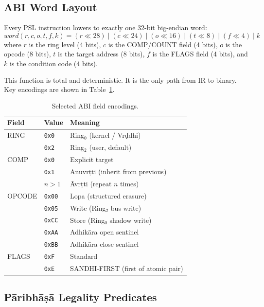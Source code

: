 \documentclass[11pt,a4paper]{article}
\begin{document}
\subsection{ABI Word Layout}

Every PSL instruction lowers to exactly one 32-bit big-endian word:
\begin{equation}
\label{eq:word}
  \mathit{word}(r,c,o,t,f,k) =
    (r \ll 28) \;|\; (c \ll 24) \;|\; (o \ll 16) \;|\; (t \ll 8)
    \;|\; (f \ll 4) \;|\; k
\end{equation}
where $r$ is the ring level (4 bits), $c$ is the COMP/COUNT field (4 bits),
$o$ is the opcode (8 bits), $t$ is the target address (8 bits), $f$ is the
FLAGS field (4 bits), and $k$ is the condition code (4 bits).

This function is total and deterministic. It is the only path from IR to
binary. Key encodings are shown in Table~\ref{tab:fields}.

\begin{table}[t]
\caption{Selected ABI field encodings.}
\label{tab:fields}
\begin{tabular}{lll}
\toprule
\textbf{Field} & \textbf{Value} & \textbf{Meaning} \\
\midrule
RING & \texttt{0x0} & Ring$_0$ (kernel / Vr\d{d}dhi) \\
     & \texttt{0x2} & Ring$_2$ (user, default) \\
\midrule
COMP & \texttt{0x0} & Explicit target \\
     & \texttt{0x1} & Anuvr\d{t}ti (inherit from previous) \\
     & $n > 1$      & \={A}vr\d{t}ti (repeat $n$ times) \\
\midrule
OPCODE & \texttt{0x00} & Lopa (structured erasure) \\
       & \texttt{0x05} & Write (Ring$_2$ bus write) \\
       & \texttt{0xCC} & Store (Ring$_0$ shadow write) \\
       & \texttt{0xAA} & Adhi\-k\={a}ra open sentinel \\
       & \texttt{0xBB} & Adhi\-k\={a}ra close sentinel \\
\midrule
FLAGS & \texttt{0xF} & Standard \\
      & \texttt{0xE} & SANDHI-FIRST (first of atomic pair) \\
\bottomrule
\end{tabular}
\end{table}

\subsection{P\={a}ribh\={a}\d{s}\={a} Legality Predicates}
\label{sec:paribhasha}
\end{document}

